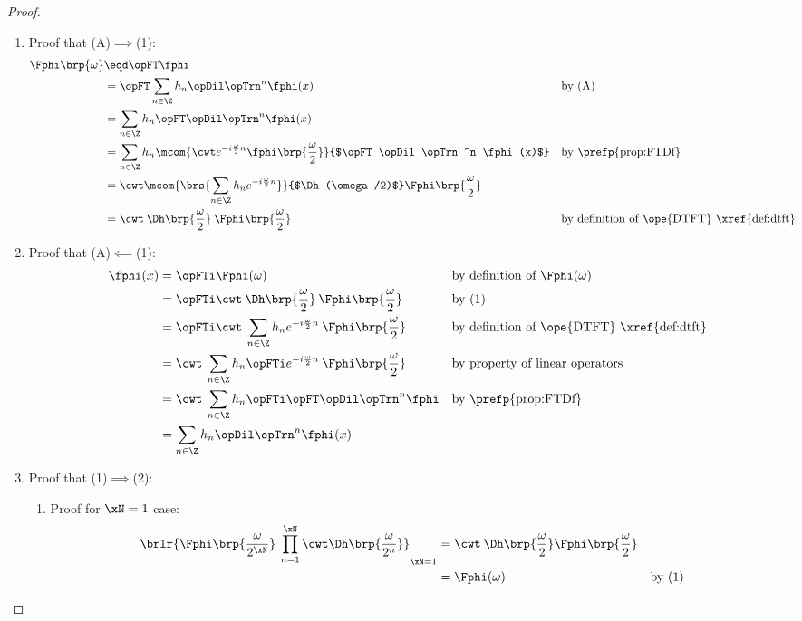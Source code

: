 \begin{proof}
\begin{enumerate}
  \item Proof that (A)$\implies$(1): \label{item:Fphi_A1}
    \begin{align*}
      \Fphi\brp{\omega}
        &\eqd \opFT\fphi
      \\&= \opFT\sum_{n\in\Z} h_n \opDil \opTrn^n \fphi(x)
        && \text{by (A)}
      \\&= \sum_{n\in\Z} h_n \opFT\opDil\opTrn^n \fphi(x)
      \\&= \sum_{n\in\Z} h_n \mcom{\cwt e^{-i\frac{\omega}{2} n}\fphi\brp{\frac{\omega}{2}}}{$\opFT\opDil\opTrn^n \fphi(x)$}
        && \text{by \prefp{prop:FTDf}}
      \\&= \cwt \mcom{\brs{\sum_{n\in\Z} h_n e^{-i\frac{\omega}{2} n}}}{$\Dh(\omega/2)$} \Fphi\brp{\frac{\omega}{2}}
      \\&= \cwt\:\Dh\brp{\frac{\omega}{2}}\: \Fphi\brp{\frac{\omega}{2}}
        && \text{by definition of \ope{DTFT} \xref{def:dtft}}
    \end{align*}

  \item Proof that (A)$\impliedby$(1):
    \begin{align*}
      \fphi(x) 
        &= \opFTi\Fphi(\omega)
        && \text{by definition of $\Fphi(\omega)$}
      \\&= \opFTi\cwt\:\Dh\brp{\frac{\omega}{2}}\: \Fphi\brp{\frac{\omega}{2}}
        && \text{by (1)}
      \\&= \opFTi\cwt\:\sum_{n\in\Z}h_n e^{-i\frac{\omega}{2} n}\: \Fphi\brp{\frac{\omega}{2}}
        && \text{by definition of \ope{DTFT} \xref{def:dtft}}
      \\&= \cwt\:\sum_{n\in\Z}h_n \opFTi e^{-i\frac{\omega}{2} n}\: \Fphi\brp{\frac{\omega}{2}}
        && \text{by property of linear operators}
      \\&= \cwt\:\sum_{n\in\Z}h_n \opFTi \opFT\opDil\opTrn^n\fphi
        && \text{by \prefp{prop:FTDf}}
      \\&= \sum_{n\in\Z} h_n \opDil\opTrn^n \fphi(x)
    \end{align*}

  \item Proof that (1)$\implies$(2):
    \begin{enumerate}
      \item Proof for $\xN=1$ case:
        \begin{align*}
          \brlr{\Fphi\brp{\frac{\omega}{2^\xN}}\:\prod_{n=1}^\xN \cwt \Dh\brp{\frac{\omega}{2^n}}}_{\xN=1}
            &= \cwt\:\Dh\brp{\frac{\omega}{2}}\Fphi\brp{\frac{\omega}{2}}
          \\&= \Fphi(\omega)
            && \text{by (1)}
        \end{align*}


\end{enumerate}
\end{enumerate}
\end{proof}

